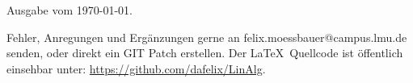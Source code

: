 Ausgabe vom \today.

Fehler, Anregungen und Ergänzungen gerne an felix.moessbauer@campus.lmu.de senden, oder direkt ein GIT Patch erstellen. Der \LaTeX ~Quellcode ist öffentlich einsehbar unter: \url{https://github.com/dafelix/LinAlg}.
